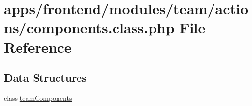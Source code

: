 \hypertarget{frontend_2modules_2team_2actions_2components_8class_8php}{\section{apps/frontend/modules/team/actions/components.class.\-php File Reference}
\label{frontend_2modules_2team_2actions_2components_8class_8php}
}
\subsection*{Data Structures}
\begin{DoxyCompactItemize}
\item 
class \hyperlink{classteam_components}{team\-Components}
\end{DoxyCompactItemize}
